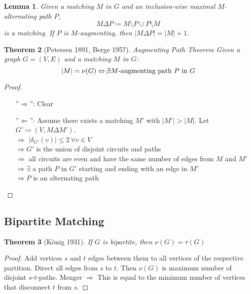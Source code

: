 \documentclass[11pt, a4paper]{article}
\newcommand{\abs}[1]{\left\lvert#1\right\rvert}
\newtheorem{theorem}{Theorem}[section]
\newtheorem{lemma}[theorem]{Lemma}
\theoremstyle{remark}
\theoremstyle{definition}
\begin{document}
\begin{lemma}
	Given a matching $M$ in $G$ and an inclusion-wise maximal
	$M$-alternating path $P$,
	\[M\Delta P\coloneqq M\setminus P\cup P\setminus M\]
	is a matching. If $P$ is $M$-augmenting, then
	$\abs{M\Delta P}=\abs{M}+1$.
\end{lemma}

\begin{theorem}[Petersen 1891, Berge 1957]{Augmenting Path Theorem}
	Given a graph $G=(V,E)$ and a matching $M$ in $G$:
	\[\abs{M}=\nu(G) \Leftrightarrow \not\exists \text{$M$-augmenting
	path $P$ in $G$}\]
\end{theorem}
\begin{proof}\ 
\begin{enumerate}
	\item[''$\Rightarrow$'':] Clear
	\item[''$\Leftarrow$'':] Assume there exists a matching $M'$
	with $\abs{M'}>\abs{M}$. Let $G'\coloneqq (V, M\Delta M')$. \\
	$\Rightarrow$ $\abs{\delta_{G'}(v)}\leq 2\ \forall v\in V$ \\
	$\Rightarrow G'$ is the union of disjoint circuits and paths \\
	$\Rightarrow$ all circuits are even and have the same number of edges
	from $M$ and $M'$ \\
	$\Rightarrow \exists$ a path $P$ in $G'$ starting and ending with an
	edge in $M'$ \\
	$\Rightarrow P$ is an alternating path
\end{enumerate}
\end{proof}

\subsection{Bipartite Matching}

\begin{theorem}[König 1931]\label{thm:koenig-bipartite}
	If $G$ is bipartite, then $\nu(G)=\tau(G)$
\end{theorem}
\begin{proof}
	Add vertices $s$ and $t$ edges between them to all vertices of the
	respective partition. Direct all edges from $s$ to $t$. Then
	$\nu(G)$ is maximum number of disjoint $s$-$t$-paths. Menger
	$\Rightarrow$ This is equal to the minimum number of vertices that
	disconnect $t$ from $s$.
\end{proof}
\end{document}
